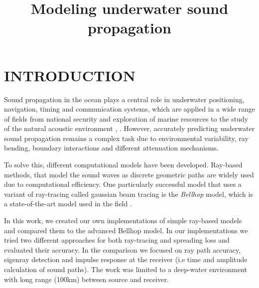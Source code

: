 \documentclass[fleqn]{jaes}
\begin{document}


\title{Modeling underwater sound propagation}


\maketitle

\setcounter{section}{0} %

\section{INTRODUCTION}
Sound propagation in the ocean plays a central role in underwater positioning, navigation, timing and communication systems, which are applied in a wide range of fields from national security and exploration of marine resources to the study of the natural acoustic environment \cite{Huang}, \cite{Etter}. However, accurately predicting underwater sound propagation remains a complex task due to environmental variability, ray bending, boundary interactions and different attenuation mechanisms.

To solve this, different computational models have been developed. Ray-based methods, that model the sound waves as discrete geometric paths are widely used due to computational efficiency. One particularly successful model that uses a variant of ray-tracing called gaussian beam tracing is the \textit{Bellhop} model, which is a state-of-the-art model used in the field \cite{Porter}.

In this work, we created our own implementations of simple ray-based models and compared them to the advanced Bellhop model. In our implementations we tried two different approaches for both ray-tracing and spreading loss and evaluated their accuracy. In the comparison we focused on ray path accuracy, eigenray detection and impulse response at the receiver (i.e time and amplitude calculation of sound paths). The work was limited to a deep-water environment with long range (100km) between source and receiver.
\end{document}
